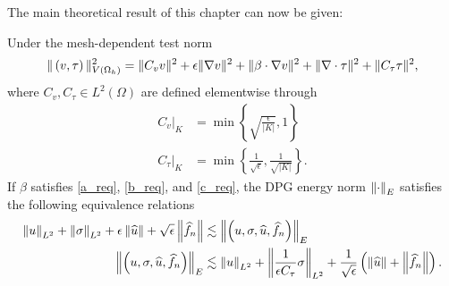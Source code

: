 The main theoretical result of this chapter can now be given:
\begin{lemma}
Under the mesh-dependent test norm
\[
\|\left(v,\tau\right)\|_{V(\Oh)}^2 = \|C_vv\|^2 + \epsilon \|\grad v\|^2 + \|\beta \cdot \grad v\|^2 + \| \div \tau\|^2 + \|C_\tau\tau\|^2,
\]
where $C_v, C_{\tau}\in L^2(\Omega)$ are defined elementwise through
\begin{align*}
\left.C_v\right |_K &= \min\left\{\sqrt{\frac{\epsilon}{|K|}},1\right\}\\
\left.C_{\tau}\right |_K &= \min\left\{\frac{1}{\sqrt{\epsilon}},\frac{1}{\sqrt{|K|}}\right\}.
\end{align*}
If $\beta$ satisfies \eqref{a_req}, \eqref{b_req}, and \eqref{c_req}, the DPG energy norm $\nor{\cdot}_E$ satisfies the following equivalence relations
\begin{align*}
\nor{u}_{L^2} + \nor{\sigma}_{L^2} + \epsilon\nor{\widehat{u}} + \sqrt{\epsilon}\nor{\widehat{f}_n} 
&\lesssim \nor{\left(u,\sigma, \widehat{u},\widehat{f}_n\right)}_E \\ 
\nor{\left(u,\sigma, \widehat{u},\widehat{f}_n\right)}_E &\lesssim \nor{u}_{L^2} + \nor{\frac{1}{\epsilon C_\tau} \sigma}_{L^2} + \frac{1}{\sqrt{\epsilon}} \left(\nor{\widehat{u}} + \nor{\widehat{f}_n}\right).
\end{align*}
\end{lemma}

